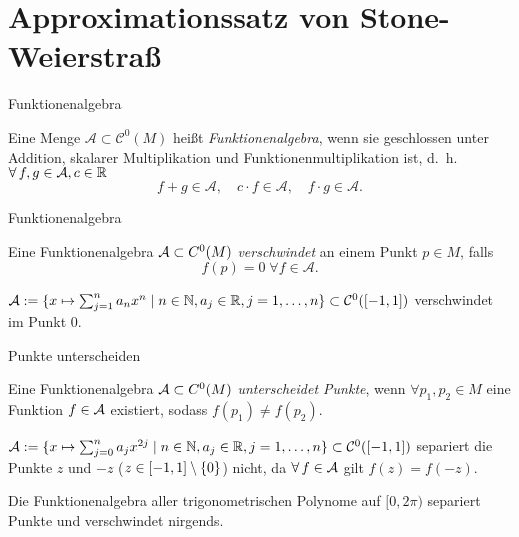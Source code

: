 \section{Approximationssatz von Stone-Weierstraß}

\begin{frame}{Funktionenalgebra}
    \begin{defi}[Funktionenalgebra]
        Eine Menge \( \mathcal{A} \subset \mathcal{C}^0(M) \) heißt 
        \textit{Funktionenalgebra}, wenn sie geschlossen unter Addition, 
        skalarer Multiplikation und Funktionenmultiplikation ist, 
        d.~h. \( \forall f,g \in \A, c \in \mathbb{R} \)
        \[ f + g \in \mathcal{A}, \quad c \cdot f \in \mathcal{A}, \quad f \cdot g \in \mathcal{A}. \]
    \end{defi}
\end{frame}

\begin{frame}{Funktionenalgebra}
    \begin{defi}[Verschwinden]
        Eine Funktionenalgebra \(\mathcal{A} \subset C^0(M)\) 
        \textit{verschwindet} an einem Punkt \(p \in M\), falls 
        \[ f(p) = 0 \;\forall f \in \mathcal{A}. \]
    \end{defi}
    \pause
    \begin{bsp}
        \( \mathcal{A} := \{ x \mapsto \sum_{j=1}^n a_n x^n \;|\; n\in \mathbb{N}, a_j \in \mathbb{R}, j = 1,\ldots, n \} \subset \mathcal{C}^0([-1,1]) \) 
        verschwindet im Punkt \(0\).
    \end{bsp}
\end{frame}

\begin{frame}{Punkte unterscheiden}
    \begin{defi}
        Eine Funktionenalgebra \(\mathcal{A} \subset C^0(M)\) \textit{unterscheidet Punkte}, 
        wenn \( \forall p_1, p_2 \in M \) eine Funktion \(f \in \mathcal{A}\) existiert, 
        sodass \( f(p_1) \neq f(p_2) \).
    \end{defi}
    \pause
    \begin{bsp}
        \( \mathcal{A} := \{ x \mapsto \sum_{j=0}^n a_{j} x^{2j} \;|\; n\in\mathbb{N}, a_j \in \mathbb{R}, j = 1,\ldots, n \} 
        \subset \mathcal{C}^0([-1,1]) \)
        separiert die Punkte \( z \) und \(-z\) (\(z \in [-1,1] \setminus \{0\} \)) nicht, da \( \forall f \in \A \) gilt 
        \( f(z) = f(-z) \).
    \end{bsp}
    \pause
    \begin{bsp}
        Die Funktionenalgebra aller trigonometrischen Polynome auf \( [0,2\pi) \) 
        separiert Punkte und verschwindet nirgends.
    \end{bsp}
\end{frame}

